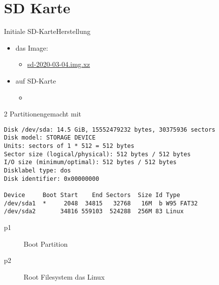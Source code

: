 \section{SD Karte}
\begin{frame}{Initiale SD-Karte}{Herstellung}
 \begin{itemize}
  \item das Image:
  \begin{itemize}
   \item \href{https://drive.switch.ch/index.php/s/A6H382zEGDrgfAL}{sd-2020-03-04.img.xz}
  \end{itemize}
  \item auf SD-Karte
  \begin{itemize}
   \item {}
  \end{itemize}
 \end{itemize}
\end{frame}

\begin{frame}[fragile]{2 Partitionen}{gemacht mit }
{
\footnotesize
\begin{verbatim}
Disk /dev/sda: 14.5 GiB, 15552479232 bytes, 30375936 sectors
Disk model: STORAGE DEVICE  
Units: sectors of 1 * 512 = 512 bytes
Sector size (logical/physical): 512 bytes / 512 bytes
I/O size (minimum/optimal): 512 bytes / 512 bytes
Disklabel type: dos
Disk identifier: 0x00000000

Device     Boot Start    End Sectors  Size Id Type
/dev/sda1  *     2048  34815   32768   16M  b W95 FAT32
/dev/sda2       34816 559103  524288  256M 83 Linux
\end{verbatim}
}
\begin{description}
 \item[p1] Boot Partition
 \item[p2] Root Filesystem das Linux
\end{description}
\end{frame}

